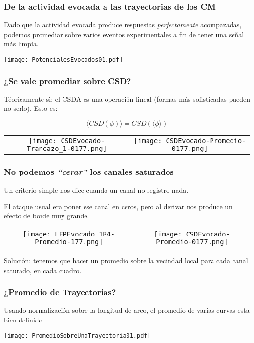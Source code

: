 \documentclass{beamer}
\begin{document}
\begin{frame}
  \frametitle{De la actividad evocada a las trayectorias de los CM}
  Dado que la actividad evocada produce respuestas
  \emph{perfectamente} acompazadas, podemos
  promediar sobre varios eventos experimentales
  a fin de tener una señal más limpia. 
  \begin{center}
   \texttt{[image: PotencialesEvocados01.pdf]} 
  \end{center}
\end{frame}


\begin{frame}
  \frametitle{¿Se vale promediar sobre CSD?}
    Téoricamente sì: el CSDA es una operación lineal
    (formas más sofisticadas pueden no serlo). Esto es:
    
\begin{equation}
 \langle CSD(\phi) \rangle = CSD (\langle \phi \rangle)
\end{equation}

\begin{center}
  \begin{tabular}{cc}
    \texttt{[image: CSDEvocado-Trancazo\_1-0177.png]} &
    \texttt{[image: CSDEvocado-Promedio-0177.png]} 
  \end{tabular}
\end{center}
    
\end{frame}


\begin{frame}
  \frametitle{No podemos \emph{``cerar''} los canales saturados}
  Un criterio simple nos dice cuando un canal no registro nada.

  El ataque usual era poner ese canal en ceros, pero al derivar
  nos produce un efecto de borde muy grande.
  
\begin{center}
  \begin{tabular}{cc}
    \texttt{[image: LFPEvocado\_1R4-Promedio-177.png]} &
    \texttt{[image: CSDEvocado-Promedio-0177.png]} 
  \end{tabular}
\end{center}
Solución: tenemos que hacer un promedio sobre la vecindad local
para cada canal saturado, en cada cuadro.
\end{frame}


\begin{frame}
\frametitle{¿Promedio de Trayectorias?}
Usando normalización sobre la longitud de arco, el
promedio de varias curvas esta bien definido.
\begin{center}
\texttt{[image: PromedioSobreUnaTrayectoria01.pdf]}
\end{center}
\end{frame}
\end{document}
